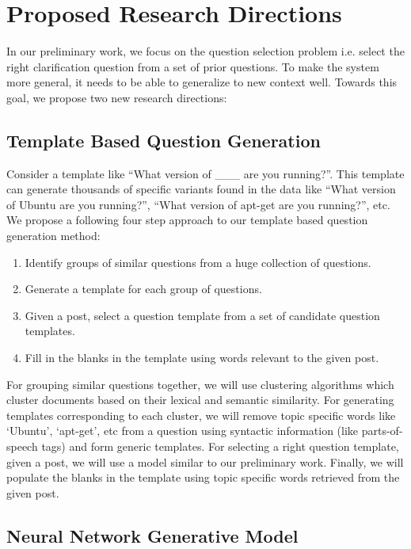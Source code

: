\documentclass[11pt,a4paper]{article}
\begin{document}
\section{Proposed Research Directions}

In our preliminary work, we focus on the question selection problem i.e. select the right clarification question from a set of prior questions.
To make the system more general, it needs to be able to generalize to new context well. Towards this goal, we propose two new research directions:

\subsection{Template Based Question Generation}

 Consider a template like ``What version of \_\_\_  are you running?''. This template can generate thousands of specific variants found in the data like ``What version of Ubuntu are you running?'',  ``What version of apt-get are you running?'', etc. We propose a following four step approach to our template based question generation method:

\begin{enumerate} 
\item Identify groups of similar questions from a huge collection of questions.
\item Generate a template for each group of questions.
\item Given a post, select a question template from a set of candidate question templates.
\item Fill in the blanks in the template using words relevant to the given post.
\end{enumerate}

For grouping similar questions together, we will use clustering algorithms which cluster documents based on their lexical and semantic similarity. For generating templates corresponding to each cluster, we will remove topic specific words like `Ubuntu', `apt-get', etc from a question using syntactic information (like parts-of-speech tags) and form generic templates. For selecting a right question template, given a post, we will use a model similar to our preliminary work. Finally, we will populate the blanks in the template using topic specific words retrieved from the given post. 

\subsection{Neural Network Generative Model}
  
\end{document}
